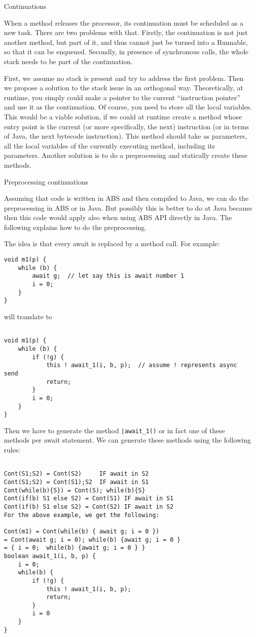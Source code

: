 Continuations

When a method releases the processor, its continuation must be scheduled as a new task. There are two problems with that. Firstly, the continuation is not just another method, but part of it, and thus cannot just be turned into a Runnable, so that it can be enqueued. Secondly, in presence of synchronous calls, the whole stack needs to be part of the continuation.

First, we assume no stack is present and try to address the first problem. Then we propose a solution to the stack issue in an orthogonal way.
Theoretically, at runtime, you simply could make a pointer to the current “instruction pointer” and use it as the continuation. Of course, you need to store all the local variables. This would be a viable solution, if we could at runtime create a method whose entry point is the current (or more specifically, the next) instruction (or in terms of Java, the next bytecode instruction). This method should take as parameters, all the local variables of the currently executing method, including its parameters. Another solution is to do a preprocessing and statically create these methods.

Preprocessing continuations

Assuming that code is written in ABS and then compiled to Java, we can do the preprocessing in ABS or in Java. But possibly this is better to do at Java because then this code would apply also when using ABS API directly in Java. The following explains how to do the preprocessing.

The idea is that every await is replaced by a method call. For example:

\begin{verbatim}
void m1(p) {
	while (b) {
		await g;  // let say this is await number 1
		i = 0;
	}
}
\end{verbatim}

will translate to

\begin{verbatim}

void m1(p) {
	while (b) { 
		if (!g) {
			this ! await_1(i, b, p);  // assume ! represents async send 
			return;
		}
		i = 0;
	}
}
\end{verbatim}

Then we have to generate the method \verb"|await_1()" or in fact one of these methods per await statement. We can generate these methods using the following rules:


\begin{verbatim}

Cont(S1;S2) = Cont(S2)     IF await in S2
Cont(S1;S2) = Cont(S1);S2  IF await in S1
Cont(while(b){S}) = Cont(S); while(b){S}
Cont(if(b) S1 else S2) = Cont(S1) IF await in S1
Cont(if(b) S1 else S2) = Cont(S2) IF await in S2
For the above example, we get the following:

Cont(m1) = Cont(while(b) { await g; i = 0 })
= Cont(await g; i = 0); while(b) {await g; i = 0 }
= { i = 0;  while(b) {await g; i = 0 } }
boolean await_1(i, b, p) {
	i = 0;  
	while(b) {
		if (!g) {
			this ! await_1(i, b, p);
			return;
		}
		i = 0 
	}
}
\end{verbatim}


